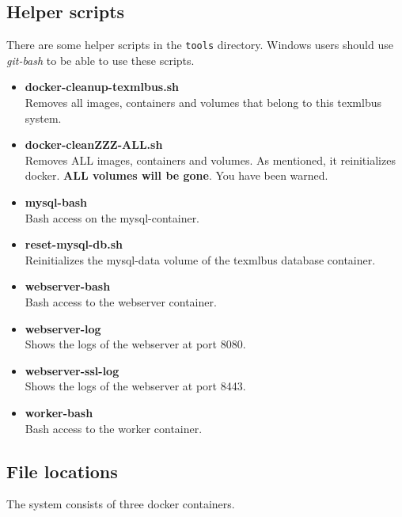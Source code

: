 \documentclass[a4paper]{article}
\begin{document}
\subsection{Helper scripts}
There are some helper scripts in the \texttt{tools} directory. Windows users should use \textit{git-bash} to be able to use these scripts.
\begin{itemize}
\item \textbf{docker-cleanup-texmlbus.sh}\\
Removes all images, containers and volumes that belong to this texmlbus system.

\item \textbf{docker-cleanZZZ-ALL.sh}\\
Removes ALL images, containers and volumes. As mentioned, it reinitializes docker. \textbf{ALL volumes will be gone}. You have been warned.

\item \textbf{mysql-bash}\\
Bash access on the mysql-container.

\item \textbf{reset-mysql-db.sh}\\
Reinitializes the mysql-data volume of the texmlbus database container.

\item \textbf{webserver-bash}\\
Bash access to the webserver container.

\item \textbf{webserver-log}\\
Shows the logs of the webserver at port 8080.

\item \textbf{webserver-ssl-log}\\
Shows the logs of the webserver at port 8443.

\item \textbf{worker-bash}\\
Bash access to the worker container.

\end{itemize}

\subsection{File locations}

The system consists of three docker containers.
\end{document}
